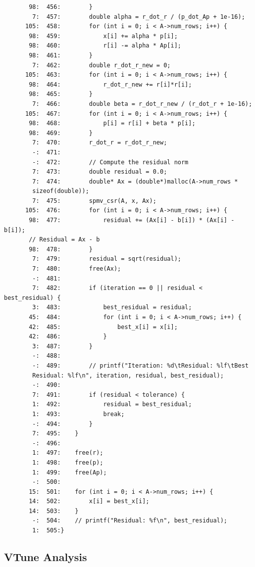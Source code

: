 \documentclass[12pt]{article}
\begin{document}
\begin{mdframed}[style=myboxstyleTerminal1]
\begin{verbatim}
       98:  456:        }
        7:  457:        double alpha = r_dot_r / (p_dot_Ap + 1e-16);
      105:  458:        for (int i = 0; i < A->num_rows; i++) {
       98:  459:            x[i] += alpha * p[i];
       98:  460:            r[i] -= alpha * Ap[i];
       98:  461:        }
        7:  462:        double r_dot_r_new = 0;
      105:  463:        for (int i = 0; i < A->num_rows; i++) {
       98:  464:            r_dot_r_new += r[i]*r[i];
       98:  465:        }
        7:  466:        double beta = r_dot_r_new / (r_dot_r + 1e-16);
      105:  467:        for (int i = 0; i < A->num_rows; i++) {
       98:  468:            p[i] = r[i] + beta * p[i];
       98:  469:        }
        7:  470:        r_dot_r = r_dot_r_new;
        -:  471:
        -:  472:        // Compute the residual norm
        7:  473:        double residual = 0.0;
        7:  474:        double* Ax = (double*)malloc(A->num_rows * 
        sizeof(double));
        7:  475:        spmv_csr(A, x, Ax);
      105:  476:        for (int i = 0; i < A->num_rows; i++) {
       98:  477:            residual += (Ax[i] - b[i]) * (Ax[i] - b[i]); 
       // Residual = Ax - b
       98:  478:        }
        7:  479:        residual = sqrt(residual);
        7:  480:        free(Ax);
        -:  481:
        7:  482:        if (iteration == 0 || residual < best_residual) {
        3:  483:            best_residual = residual;
       45:  484:            for (int i = 0; i < A->num_rows; i++) {
       42:  485:                best_x[i] = x[i];
       42:  486:            }
        3:  487:        }
        -:  488:
        -:  489:        // printf("Iteration: %d\tResidual: %lf\tBest 
        Residual: %lf\n", iteration, residual, best_residual);
        -:  490:
        7:  491:        if (residual < tolerance) {
        1:  492:            residual = best_residual;
        1:  493:            break;
        -:  494:        } 
        7:  495:    }
        -:  496:
        1:  497:    free(r);
        1:  498:    free(p);
        1:  499:    free(Ap);
        -:  500:
       15:  501:    for (int i = 0; i < A->num_rows; i++) {
       14:  502:        x[i] = best_x[i];
       14:  503:    }
        -:  504:    // printf("Residual: %f\n", best_residual);
        1:  505:}
		\end{verbatim}
	\end{mdframed}

\subsection{VTune Analysis}
\end{document}
